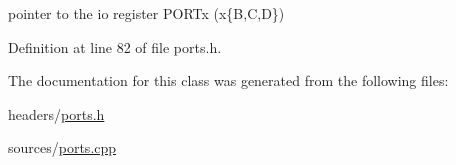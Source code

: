 pointer to the io register P\-O\-R\-Tx (x\{B,C,D\}) 



Definition at line 82 of file ports.\-h.



The documentation for this class was generated from the following files\-:\begin{DoxyCompactItemize}
\item 
headers/\hyperlink{ports_8h}{ports.\-h}\item 
sources/\hyperlink{ports_8cpp}{ports.\-cpp}\end{DoxyCompactItemize}
